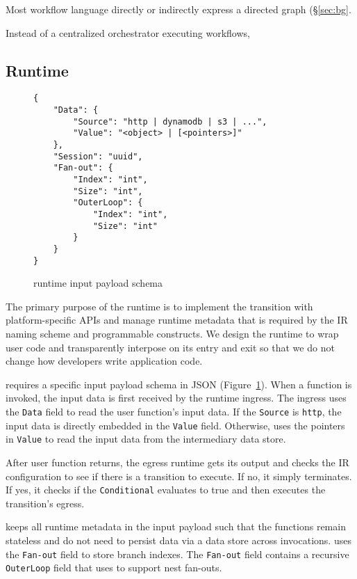 Most workflow language directly or indirectly express a directed graph
(\S\ref{sec:bg}.

Instead of a centralized orchestrator executing workflows, \name{}



\subsection{\name{} Runtime}

\begin{figure}[]
    \begin{verbatim}
{
    "Data": {
        "Source": "http | dynamodb | s3 | ...",
        "Value": "<object> | [<pointers>]"
    },
    "Session": "uuid",
    "Fan-out": {
        "Index": "int",
        "Size": "int",
        "OuterLoop": {
            "Index": "int",
            "Size": "int"
        }
    }
}
    \end{verbatim}
    \caption{\name{} runtime input payload schema}
    \label{fig:input-format}
\end{figure}

The primary purpose of the \name{} runtime is to implement the transition with
platform-specific APIs and manage runtime metadata that is required by the
\name{} IR naming scheme and programmable constructs. We design the runtime to
wrap user code and transparently interpose on its entry and exit so that we do
not change how developers write application code.

 \name{} requires a specific input payload schema in JSON
(Figure~\ref{fig:input-format}). When a function is invoked, the input data is
first received by the runtime ingress. The ingress uses the \texttt{Data}
field to read the user function's input data. If the \texttt{Source} is
\texttt{http}, the input data is directly embedded in the \texttt{Value}
field. Otherwise, \name{} uses the pointers in \texttt{Value} to read the
input data from the intermediary data store.

After user function returns, the egress runtime gets its output and checks the
IR configuration to see if there is a transition to execute. If no, it simply
terminates. If yes, it checks if the \texttt{Conditional} evaluates to true
and then executes the transition's egress.

\name{} keeps all runtime metadata in the input payload such that the
functions remain stateless and do not need to persist data via a data store
across invocations. \name{} uses the \texttt{Fan-out} field to store branch
indexes. The \texttt{Fan-out} field contains a recursive \texttt{OuterLoop}
field that \name{} uses to support nest fan-outs.


